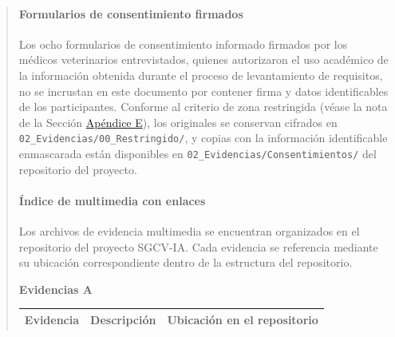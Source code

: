 \documentclass[
]{article}
\newcounter{none} %
\begin{document}
\begin{quote}
\paragraph{Formularios de consentimiento
firmados}\label{formularios-de-consentimiento-firmados}

Los ocho formularios de consentimiento informado firmados por los
médicos veterinarios entrevistados, quienes autorizaron el uso académico
de la información obtenida durante el proceso de levantamiento de
requisitos, no se incrustan en este documento por contener firma y datos
identificables de los participantes. Conforme al criterio de zona
restringida (véase la nota de la Sección \hyperref[apendice-e-repositorio]{Apéndice E}),
los originales se conservan cifrados en
\texttt{02\_Evidencias/00\_Restringido/}, y copias con la información
identificable enmascarada están disponibles en
\texttt{02\_Evidencias/Consentimientos/} del repositorio del proyecto.


\paragraph{Índice de multimedia con
enlaces}\label{indice-de-multimedia-con-enlaces}

Los archivos de evidencia multimedia se encuentran organizados en el
repositorio del proyecto SGCV-IA. Cada evidencia se referencia mediante
su ubicación correspondiente dentro de la estructura del repositorio.

\textbf{Evidencias A}

{\def\LTcaptype{none}
\begin{longtable}[]{|
  >{\raggedright\arraybackslash}p{}|
  >{\raggedright\arraybackslash}p{}|
  >{\raggedright\arraybackslash}p{}|}

\hline

\begin{minipage}[b]{\linewidth}\centering
\textbf{Evidencia}
\end{minipage}
&
\begin{minipage}[b]{\linewidth}\centering
\textbf{Descripción}
\end{minipage}
&
\begin{minipage}[b]{\linewidth}\centering
\textbf{Ubicación en el repositorio}
\end{minipage}
\\

\hline
\endhead


\end{longtable}}
\end{quote}
\end{document}
